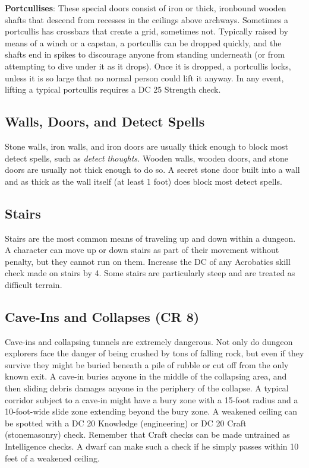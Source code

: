 \textbf{Portcullises}: These special doors consist of iron or thick, ironbound wooden shafts that descend from recesses in the ceilings above archways. Sometimes a portcullis has crossbars that create a grid, sometimes not. Typically raised by means of a winch or a capstan, a portcullis can be dropped quickly, and the shafts end in spikes to discourage anyone from standing underneath (or from attempting to dive under it as it drops). Once it is dropped, a portcullis locks, unless it is so large that no normal person could lift it anyway. In any event, lifting a typical portcullis requires a DC 25 Strength check.
				
\subsection{Walls, Doors, and Detect Spells}

				
Stone walls, iron walls, and iron doors are usually thick enough to block most detect spells, such as \textit{detect thoughts. }Wooden walls, wooden doors, and stone doors are usually not thick enough to do so. A secret stone door built into a wall and as thick as the wall itself (at least 1 foot) does block most detect spells.
				
\subsection{Stairs}

				
Stairs are the most common means of traveling up and down within a dungeon. A character can move up or down stairs as part of their movement without penalty, but they cannot run on them. Increase the DC of any Acrobatics skill check made on stairs by 4. Some stairs are particularly steep and are treated as difficult terrain.
				
\subsection{Cave-Ins and Collapses (CR 8)}

				
Cave-ins and collapsing tunnels are extremely dangerous. Not only do dungeon explorers face the danger of being crushed by tons of falling rock, but even if they survive they might be buried beneath a pile of rubble or cut off from the only known exit. A cave-in buries anyone in the middle of the collapsing area, and then sliding debris damages anyone in the periphery of the collapse. A typical corridor subject to a cave-in might have a bury zone with a 15-foot radius and a 10-foot-wide slide zone extending beyond the bury zone. A weakened ceiling can be spotted with a DC 20 Knowledge (engineering) or DC 20 Craft (stonemasonry) check. Remember that Craft checks can be made untrained as Intelligence checks. A dwarf can make such a check if he simply passes within 10 feet of a weakened ceiling. 
				
